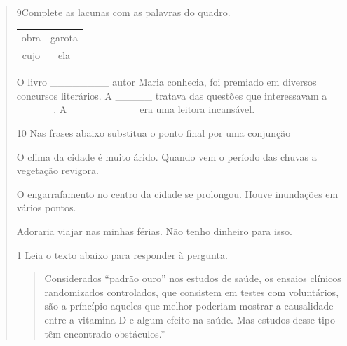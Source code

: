 \begin{quote}
{\num{9}Complete as lacunas com as palavras do quadro.

\begin{table}[]
\begin{tabular}{cc}
obra & garota \\
cujo & ela
\end{tabular}
\end{table}

O livro \_\_\_\_\_\_\_\_ autor Maria conhecia, foi premiado em diversos
concursos literários. A \_\_\_\_\_ tratava das questões que interessavam
a \_\_\_\_\_. A \_\_\_\_\_\_\_\_\_ era uma leitora incansável.


\num{10} Nas frases abaixo substitua o ponto final por uma conjunção

\begin{escolha}

  \item O clima da cidade é muito árido. Quando vem o período das chuvas a
  vegetação revigora.

  
  \item O engarrafamento no centro da cidade se prolongou. Houve inundações em
  vários pontos.

  
  \item Adoraria viajar nas minhas férias. Não tenho dinheiro para isso.


\end{escolha}


\num{1} Leia o texto abaixo para responder à pergunta.

\begin{quote}

Considerados ``padrão ouro'' nos estudos de saúde, os ensaios clínicos
randomizados controlados, que consistem em testes com voluntários, são a
príncípio aqueles que melhor poderiam mostrar a causalidade entre a
vitamina D e algum efeito na saúde. Mas estudos desse tipo têm
encontrado obstáculos.''


\end{quote}}
\end{quote}
